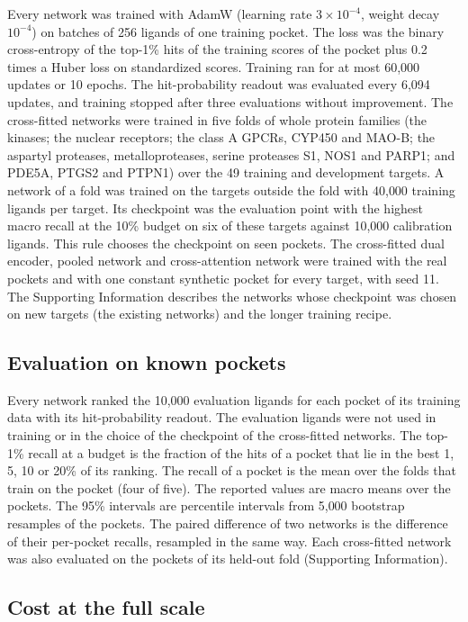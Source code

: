 Every network was trained with AdamW\cite{loshchilov2019} (learning rate $3\times10^{-4}$, weight decay $10^{-4}$) on batches of 256 ligands of one training pocket. The loss was the binary cross-entropy of the top-1\% hits of the training scores of the pocket plus 0.2 times a Huber loss on standardized scores. Training ran for at most 60{,}000 updates or 10 epochs. The hit-probability readout was evaluated every 6{,}094 updates, and training stopped after three evaluations without improvement. The cross-fitted networks were trained in five folds of whole protein families (the kinases; the nuclear receptors; the class A GPCRs, CYP450 and MAO-B; the aspartyl proteases, metalloproteases, serine proteases S1, NOS1 and PARP1; and PDE5A, PTGS2 and PTPN1) over the 49 training and development targets. A network of a fold was trained on the targets outside the fold with 40{,}000 training ligands per target. Its checkpoint was the evaluation point with the highest macro recall at the 10\% budget on six of these targets against 10{,}000 calibration ligands. This rule chooses the checkpoint on seen pockets. The cross-fitted dual encoder, pooled network and cross-attention network were trained with the real pockets and with one constant synthetic pocket for every target, with seed 11. The Supporting Information describes the networks whose checkpoint was chosen on new targets (the existing networks) and the longer training recipe.

\subsection{Evaluation on known pockets}

Every network ranked the 10{,}000 evaluation ligands for each pocket of its training data with its hit-probability readout. The evaluation ligands were not used in training or in the choice of the checkpoint of the cross-fitted networks. The top-1\% recall at a budget is the fraction of the hits of a pocket that lie in the best 1, 5, 10 or 20\% of its ranking. The recall of a pocket is the mean over the folds that train on the pocket (four of five). The reported values are macro means over the pockets. The 95\% intervals are percentile intervals from 5{,}000 bootstrap resamples of the pockets. The paired difference of two networks is the difference of their per-pocket recalls, resampled in the same way. Each cross-fitted network was also evaluated on the pockets of its held-out fold (Supporting Information).

\subsection{Cost at the full scale}

